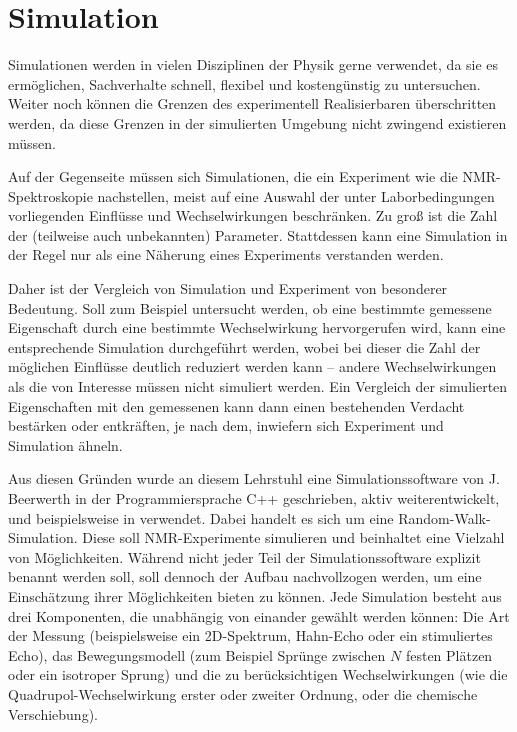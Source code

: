 \chapter{Simulation}\label{chapter:simulation}

Simulationen werden in vielen Disziplinen der Physik gerne verwendet, da sie es ermöglichen, Sachverhalte schnell, flexibel und kostengünstig zu untersuchen. Weiter noch können die Grenzen des experimentell Realisierbaren überschritten werden, da diese Grenzen in der simulierten Umgebung nicht zwingend existieren müssen.

Auf der Gegenseite müssen sich Simulationen, die ein Experiment wie die NMR-Spektroskopie nachstellen, meist auf eine Auswahl der unter Laborbedingungen vorliegenden Einflüsse und Wechselwirkungen beschränken. Zu groß ist die Zahl der (teilweise auch unbekannten) Parameter. Stattdessen kann eine Simulation in der Regel nur als eine Näherung eines Experiments verstanden werden.

Daher ist der Vergleich von Simulation und Experiment von besonderer Bedeutung. Soll zum Beispiel untersucht werden, ob eine bestimmte gemessene Eigenschaft durch eine bestimmte Wechselwirkung hervorgerufen wird, kann eine entsprechende Simulation durchgeführt werden, wobei bei dieser die Zahl der möglichen Einflüsse deutlich reduziert werden kann -- andere Wechselwirkungen als die von Interesse müssen nicht simuliert werden. Ein Vergleich der simulierten Eigenschaften mit den gemessenen kann dann einen bestehenden Verdacht bestärken oder entkräften, je nach dem, inwiefern sich Experiment und Simulation ähneln.


Aus diesen Gründen wurde an diesem Lehrstuhl eine Simulationssoftware von J. Beerwerth in der Programmiersprache C++ geschrieben, aktiv weiterentwickelt, und beispielsweise in \cite{joachim_master} verwendet. Dabei handelt es sich um eine Random-Walk-Simulation. Diese soll NMR-Experimente simulieren und beinhaltet eine Vielzahl von Möglichkeiten. Während nicht jeder Teil der Simulationssoftware explizit benannt werden soll, soll dennoch der Aufbau nachvollzogen werden, um eine Einschätzung ihrer Möglichkeiten bieten zu können. Jede Simulation besteht aus drei Komponenten, die unabhängig von einander gewählt werden können: Die Art der Messung (beispielsweise ein 2D-Spektrum, Hahn-Echo oder ein stimuliertes Echo), das Bewegungsmodell (zum Beispiel Sprünge zwischen $N$ festen Plätzen oder ein isotroper Sprung) und die zu berücksichtigen Wechselwirkungen (wie die Quadrupol-Wechselwirkung erster oder zweiter Ordnung, oder die chemische Verschiebung).


